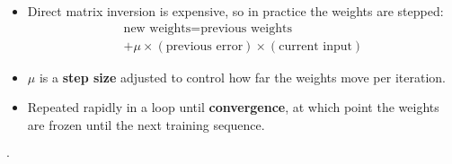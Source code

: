 {
\begin{itemize}
  \item Direct matrix inversion is expensive, so in practice the weights are stepped:
        \[ \begin{gathered} \text{new weights} = \text{previous weights} \\
           + \mu \times (\text{previous error}) \times (\text{current input})
           \end{gathered} \]
  \item $\mu$ is a \textbf{step size} adjusted to control how far the weights move per iteration.
  \item Repeated rapidly in a loop until \textbf{convergence}, at which point the weights are
        frozen until the next training sequence.
\end{itemize}}

\hr


{\color{sub}\footnotesize {}  \gap$\cdot$\gap
{}}

